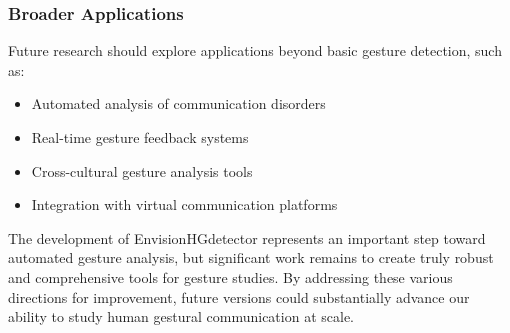 \subsubsection{Broader Applications}
Future research should explore applications beyond basic gesture detection, such as:
\begin{itemize}
    \item Automated analysis of communication disorders
    \item Real-time gesture feedback systems
    \item Cross-cultural gesture analysis tools
    \item Integration with virtual communication platforms
\end{itemize}

The development of EnvisionHGdetector represents an important step toward automated gesture analysis, but significant work remains to create truly robust and comprehensive tools for gesture studies. By addressing these various directions for improvement, future versions could substantially advance our ability to study human gestural communication at scale.